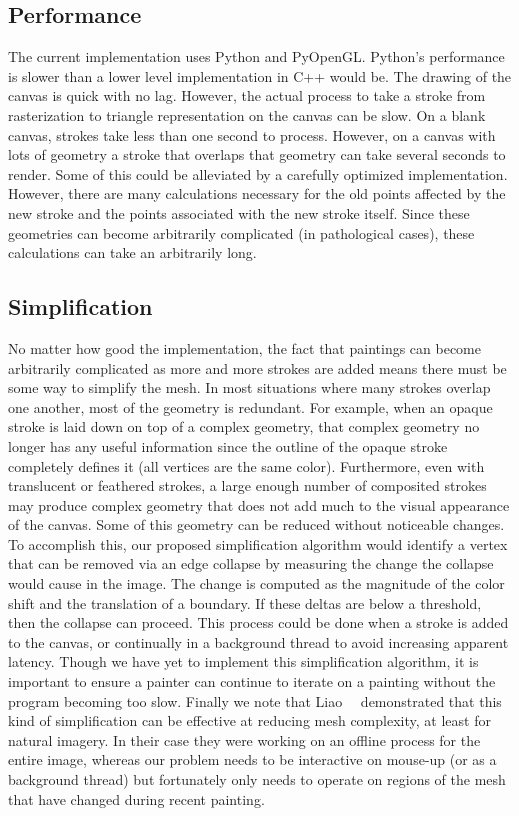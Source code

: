 \documentclass[review,draft]{acmsiggraph}
\begin{document}
\subsection{Performance}
The current implementation uses Python and PyOpenGL. Python's performance is slower than
a lower level implementation in C++ would be. The drawing of the canvas is quick with
no lag. However, the actual process to take a stroke from rasterization to triangle
representation on the canvas can be slow. On a blank canvas, strokes take less than
one second to process. However, on a canvas with lots of geometry a stroke that overlaps
that geometry can take several seconds to render. Some of this could be alleviated by a carefully optimized implementation. However, there are many calculations
necessary for the old points affected by the new stroke and the points associated with the
new stroke itself. Since these geometries can become arbitrarily complicated (in pathological cases), these
calculations can take an arbitrarily long.

\subsection{Simplification}
\label{sec:simplify}
No matter how good the implementation, the fact that paintings can become arbitrarily complicated as more and more strokes are added
means there must be some way to simplify the mesh. In most situations where
many strokes overlap one another, most of the geometry is redundant. For example, when an opaque stroke is laid down on top of a complex geometry, that complex
geometry no longer has any useful information since the outline of the opaque stroke
completely defines it (all vertices are the same color).  Furthermore, even with translucent or feathered strokes, a large enough number of 
composited strokes may produce complex geometry that does not add much to the visual appearance of the canvas. Some of this geometry can be reduced without noticeable changes.  To accomplish this, our proposed simplification algorithm would identify a vertex that can be removed via an edge collapse by measuring the change the collapse would cause in the image.  The change is computed as the magnitude of the color shift and the translation of a boundary.  If these deltas are below a threshold, then the collapse can proceed.  This process could be done when a stroke is added to the canvas, or continually in a background thread to avoid increasing apparent latency.  Though we have yet to implement this simplification algorithm, it is important to ensure a painter can continue to iterate on a painting without the program becoming too slow.
%
Finally we note that Liao~\etal~ demonstrated that this kind of simplification can be effective at reducing mesh complexity, at least for natural imagery.
%
In their case they were working on an offline process for the entire image, whereas our
problem needs to be interactive on mouse-up (or as a background thread) but fortunately
only needs to operate on regions of the mesh that have changed during recent painting.
\end{document}
